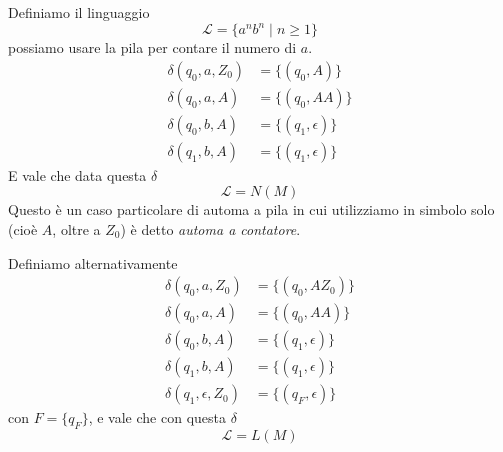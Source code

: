 \documentclass[12pt]{report}
\begin{document}
\begin{tcolorbox}
	Definiamo il linguaggio
	$$ \mathcal{L} = \{ a^n b^n \mid n \geq 1 \} $$
	possiamo usare la pila per contare il numero di $a$.
	\begin{align*}
		\delta(q_0, a, Z_0) &= \{(q_0, A)\} \\
		\delta(q_0, a, A)   &= \{(q_0, AA) \} \\
		\delta(q_0, b, A)   &= \{ (q_1, \epsilon) \} \\
		\delta(q_1, b, A)   &= \{ (q_1, \epsilon) \} 
	\end{align*}
	E vale che data questa $\delta$
	$$ \mathcal{L} = N(M) $$
	Questo è un caso particolare di automa a pila in cui utilizziamo in simbolo solo (cioè $A$, oltre a $Z_0$) è detto \textit{automa a contatore}.

	Definiamo alternativamente
	\begin{align*}
		\delta(q_0, a, Z_0) &= \{(q_0, AZ_0)\} \\
		\delta(q_0, a, A)   &= \{(q_0, AA)\} \\
		\delta(q_0, b, A)   &= \{(q_1, \epsilon)\} \\
		\delta(q_1, b, A)   &= \{(q_1, \epsilon)\} \\
		\delta(q_1, \epsilon, Z_0) &= \{(q_F, \epsilon)\}
	\end{align*}
	con $F = \{q_F\}$, e vale che con questa $\delta$
	$$ \mathcal{L} = L(M) $$
\end{tcolorbox}
\end{document}
